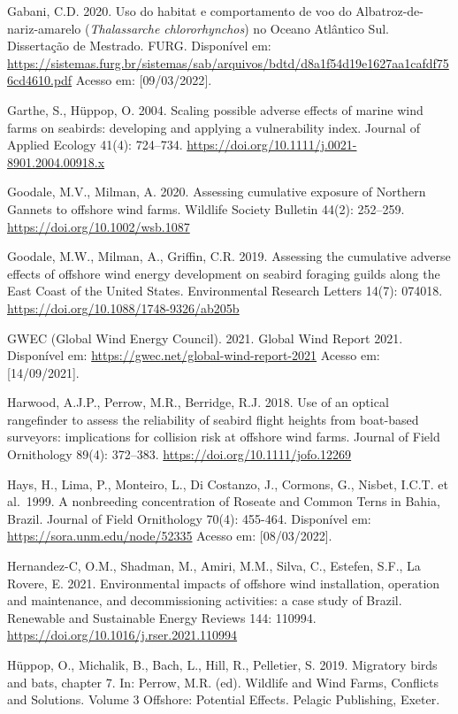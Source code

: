 \documentclass[
  oneside]{scrbook}
\begin{document}
Gabani, C.D. 2020. Uso do habitat e comportamento de voo do Albatroz-de-nariz-amarelo (\emph{Thalassarche chlororhynchos}) no Oceano Atlântico Sul. Dissertação de Mestrado. FURG. Disponível em: \url{https://sistemas.furg.br/sistemas/sab/arquivos/bdtd/d8a1f54d19e1627aa1cafdf756cd4610.pdf} Acesso em: {[}09/03/2022{]}.

Garthe, S., Hüppop, O. 2004. Scaling possible adverse effects of marine wind farms on seabirds: developing and applying a vulnerability index. Journal of Applied Ecology 41(4): 724--734. \url{https://doi.org/10.1111/j.0021-8901.2004.00918.x}

Goodale, M.V., Milman, A. 2020. Assessing cumulative exposure of Northern Gannets to offshore wind farms. Wildlife Society Bulletin 44(2): 252--259. \url{https://doi.org/10.1002/wsb.1087}

Goodale, M.W., Milman, A., Griffin, C.R. 2019. Assessing the cumulative adverse effects of offshore wind energy development on seabird foraging guilds along the East Coast of the United States. Environmental Research Letters 14(7): 074018. \url{https://doi.org/10.1088/1748-9326/ab205b}

GWEC (Global Wind Energy Council). 2021. Global Wind Report 2021. Disponível em: \url{https://gwec.net/global-wind-report-2021} Acesso em: {[}14/09/2021{]}.

Harwood, A.J.P., Perrow, M.R., Berridge, R.J. 2018. Use of an optical rangefinder to assess the reliability of seabird flight heights from boat-based surveyors: implications for collision risk at offshore wind farms. Journal of Field Ornithology 89(4): 372--383. \url{https://doi.org/10.1111/jofo.12269}

Hays, H., Lima, P., Monteiro, L., Di Costanzo, J., Cormons, G., Nisbet, I.C.T. et al.~1999. A nonbreeding concentration of Roseate and Common Terns in Bahia, Brazil. Journal of Field Ornithology 70(4): 455-464. Disponível em: \url{https://sora.unm.edu/node/52335} Acesso em: {[}08/03/2022{]}.

Hernandez-C, O.M., Shadman, M., Amiri, M.M., Silva, C., Estefen, S.F., La Rovere, E. 2021. Environmental impacts of offshore wind installation, operation and maintenance, and decommissioning activities: a case study of Brazil. Renewable and Sustainable Energy Reviews 144: 110994. \url{https://doi.org/10.1016/j.rser.2021.110994}

Hüppop, O., Michalik, B., Bach, L., Hill, R., Pelletier, S. 2019. Migratory birds and bats, chapter 7. In: Perrow, M.R. (ed). Wildlife and Wind Farms, Conflicts and Solutions. Volume 3 Offshore: Potential Effects. Pelagic Publishing, Exeter.
\end{document}
